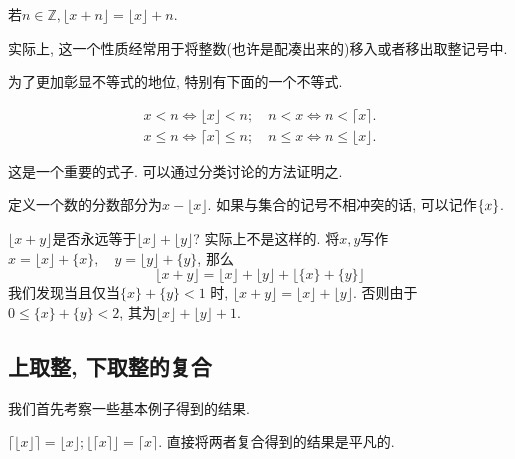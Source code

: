 \documentclass{ctexart}
\begin{document}
\begin{corollary}
    若$n \in \mathbb{Z},\lfloor x+n\rfloor=\lfloor x\rfloor+n$.
    
\end{corollary}

\begin{remark}
    实际上, 这一个性质经常用于将整数(也许是配凑出来的)移入或者移出取整记号中. 
\end{remark}

为了更加彰显不等式的地位, 特别有下面的一个不等式.

\begin{prop}[上下取整的不等式]

$$ 
\begin{gathered}
x<n \Leftrightarrow\lfloor x\rfloor<n ; \quad n<x \Leftrightarrow n<\lceil x\rceil . \\
x \leqslant n \Leftrightarrow\lceil x\rceil \leqslant n ; \quad n \leqslant x \Leftrightarrow n \leqslant\lfloor x\rfloor .
\end{gathered}
$$ 

\end{prop}

这是一个重要的式子. 可以通过分类讨论的方法证明之. 

\begin{definition}[分数部分] 定义一个数的分数部分为$x-\lfloor x\rfloor$. 如果与集合的记号不相冲突的话, 可以记作$\{x\}$. 
    
\end{definition}

\begin{example}
    $\lfloor x+y\rfloor$是否永远等于$\lfloor x\rfloor+\lfloor y\rfloor$?
    实际上不是这样的. 将$x,y$写作$x=\lfloor x\rfloor+\{x\}, \quad y=\lfloor y\rfloor+\{y\}$, 那么
\[
    \lfloor x+y\rfloor=\lfloor x\rfloor+\lfloor y\rfloor+\lfloor\{x\}+\{y\}\rfloor
\]
    我们发现当且仅当$\{x\}+\{y\}<1$ 时, $\lfloor x+y\rfloor=\lfloor x\rfloor+\lfloor y\rfloor$. 否则由于$0 \leqslant\{x\}+\{y\}<2$, 其为$\lfloor x\rfloor+\lfloor y\rfloor+1$. 
\end{example}

\subsection{上取整, 下取整的复合} 我们首先考察一些基本例子得到的结果. 

\begin{example}
    $\lceil\lfloor x\rfloor\rceil=\lfloor x\rfloor ;\lfloor\lceil x\rceil\rfloor=\lceil x\rceil$. 直接将两者复合得到的结果是平凡的. 
    
\end{example}
\end{document}
